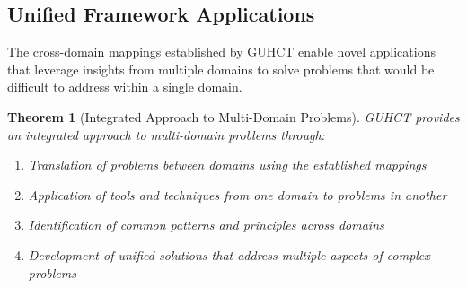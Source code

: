\documentclass[11pt,a4paper]{article}
\newtheorem{theorem}{Theorem}[section]
\begin{document}
\subsection{Unified Framework Applications}
\label{subsec:unified_applications}

The cross-domain mappings established by GUHCT enable novel applications that leverage insights from multiple domains to solve problems that would be difficult to address within a single domain.

\begin{theorem}[Integrated Approach to Multi-Domain Problems]
\label{thm:integrated_approach}
GUHCT provides an integrated approach to multi-domain problems through:
\begin{enumerate}
    \item Translation of problems between domains using the established mappings
    \item Application of tools and techniques from one domain to problems in another
    \item Identification of common patterns and principles across domains
    \item Development of unified solutions that address multiple aspects of complex problems
\end{enumerate}
\end{theorem}
\end{document}
